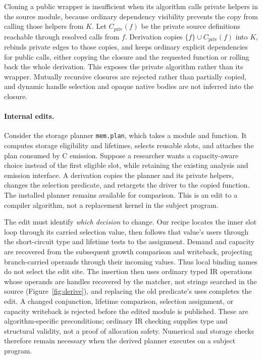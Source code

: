 \documentclass[sigplan,anonymous,review]{acmart}
\begin{document}
Cloning a public wrapper is insufficient when its algorithm calls private
helpers in the source module, because ordinary dependency visibility prevents the
copy from calling those helpers from $K$. Let $C_{\mathrm{priv}}(f)$ be the
private source definitions reachable through resolved calls from $f$. Derivation
copies $\{f\}\cup C_{\mathrm{priv}}(f)$ into $K$, rebinds private edges to
those copies, and keeps ordinary explicit dependencies for public calls, either
copying the closure and the requested function or rolling back the whole
derivation. This exposes the private algorithm rather than its wrapper.
Mutually recursive closures are rejected rather than partially copied, and
dynamic handle selection and opaque native bodies are not inferred into the
closure.

\paragraph{Internal edits.}
Consider the storage planner \texttt{mem.plan}, which takes a module and function.
It computes storage eligibility and lifetimes, selects reusable slots, and
attaches the plan consumed by C emission. Suppose a researcher wants a
capacity-aware choice instead of the first eligible slot, while retaining
the existing analysis and emission interface. A derivation copies the planner
and its private helpers, changes the selection predicate, and retargets the
driver to the copied function. The installed planner remains available for
comparison. This is an edit to a compiler algorithm, not a replacement kernel
in the subject program.

The edit must identify \emph{which decision} to change. Our recipe locates the
inner slot loop through its carried selection value, then follows that value's
users through the short-circuit type and lifetime tests to the assignment.
Demand and capacity are recovered from the subsequent growth comparison and
writeback, projecting branch-carried operands through their incoming values.
Thus local binding names do not select the edit site. The insertion then uses
ordinary typed IR operations whose operands are handles recovered by the matcher,
not strings searched in the source (Figure~\ref{fig:derive}), and replacing the
old predicate's uses completes the edit. A changed conjunction, lifetime
comparison, selection assignment, or capacity writeback is rejected before the
edited module is published. These are algorithm-specific preconditions;
ordinary IR checking supplies type and structural validity, not a proof of
allocation safety. Numerical and storage checks therefore remain necessary
when the derived planner executes on a subject program.
\end{document}
